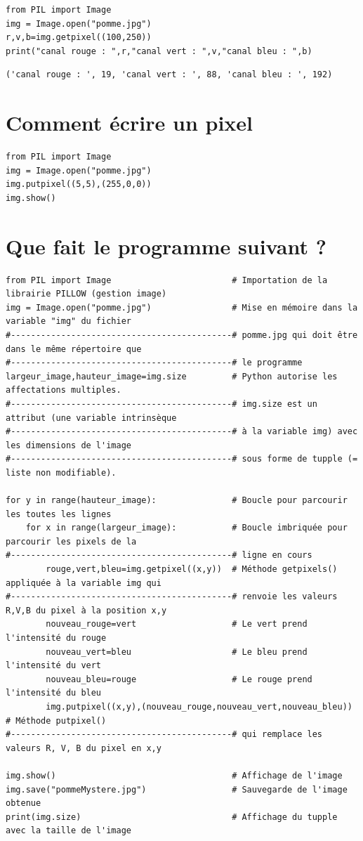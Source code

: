 \documentclass[11pt]{article}
\begin{document}
\begin{verbatim}
from PIL import Image
img = Image.open("pomme.jpg")
r,v,b=img.getpixel((100,250))
print("canal rouge : ",r,"canal vert : ",v,"canal bleu : ",b)
\end{verbatim}

\begin{verbatim}
('canal rouge : ', 19, 'canal vert : ', 88, 'canal bleu : ', 192)
\end{verbatim}


\section{Comment écrire un pixel}
\label{sec:org148285e}

\begin{verbatim}
from PIL import Image
img = Image.open("pomme.jpg")
img.putpixel((5,5),(255,0,0))
img.show()
\end{verbatim}


\section{Que fait le programme suivant ?}
\label{sec:orge5499cb}

\begin{verbatim}
from PIL import Image                        # Importation de la librairie PILLOW (gestion image)
img = Image.open("pomme.jpg")                # Mise en mémoire dans la variable "img" du fichier 
#--------------------------------------------# pomme.jpg qui doit être dans le même répertoire que
#--------------------------------------------# le programme
largeur_image,hauteur_image=img.size         # Python autorise les affectations multiples.
#--------------------------------------------# img.size est un attribut (une variable intrinsèque
#--------------------------------------------# à la variable img) avec les dimensions de l'image
#--------------------------------------------# sous forme de tupple (= liste non modifiable). 

for y in range(hauteur_image):               # Boucle pour parcourir les toutes les lignes
    for x in range(largeur_image):           # Boucle imbriquée pour parcourir les pixels de la
#--------------------------------------------# ligne en cours
        rouge,vert,bleu=img.getpixel((x,y))  # Méthode getpixels() appliquée à la variable img qui
#--------------------------------------------# renvoie les valeurs R,V,B du pixel à la position x,y
        nouveau_rouge=vert                   # Le vert prend l'intensité du rouge
        nouveau_vert=bleu                    # Le bleu prend l'intensité du vert
        nouveau_bleu=rouge                   # Le rouge prend l'intensité du bleu
        img.putpixel((x,y),(nouveau_rouge,nouveau_vert,nouveau_bleu)) # Méthode putpixel()
#--------------------------------------------# qui remplace les valeurs R, V, B du pixel en x,y 

img.show()                                   # Affichage de l'image
img.save("pommeMystere.jpg")                 # Sauvegarde de l'image obtenue
print(img.size)                              # Affichage du tupple avec la taille de l'image 
\end{verbatim}
\end{document}
